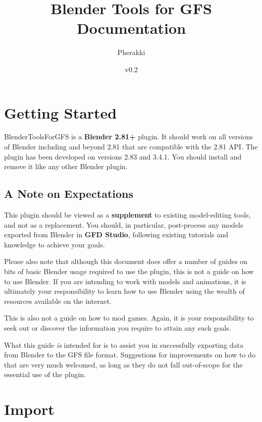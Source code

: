 \documentclass{article}
\title{Blender Tools for GFS Documentation}
\author{Pherakki}
\date{v0.2}
\begin{document}
\maketitle
{}
\clearpage

\tableofcontents
\clearpage


\section{Getting Started}
BlenderToolsForGFS is a \textbf{Blender 2.81+} plugin. It should work on all versions of Blender including and beyond 2.81 that are compatible with the 2.81 API. The plugin has been developed on versions 2.83 and 3.4.1. You should install and remove it like any other Blender plugin.

\subsection{A Note on Expectations}
This plugin should be viewed as a \textbf{supplement} to existing model-editing tools, and not as a replacement. You should, in particular, post-process any models exported from Blender in \textbf{GFD Studio}, following existing tutorials and knowledge to achieve your goals.

Please also note that although this document does offer a number of guides on bits of basic Blender usage required to use the plugin, this is not a guide on how to use Blender. If you are intending to work with models and animations, it is ultimately your responsibility to learn how to use Blender using the wealth of resources available on the internet.

This is also not a guide on how to mod games. Again, it is your responsibility to seek out or discover the information you require to attain any such goals.

What this guide \textit{is} intended for is to assist you in successfully exporting data from Blender to the GFS file format. Suggestions for improvements on how to do that are very much welcomed, as long as they do not fall out-of-scope for the essential use of the plugin.
\clearpage

\section{Import}
\end{document}

